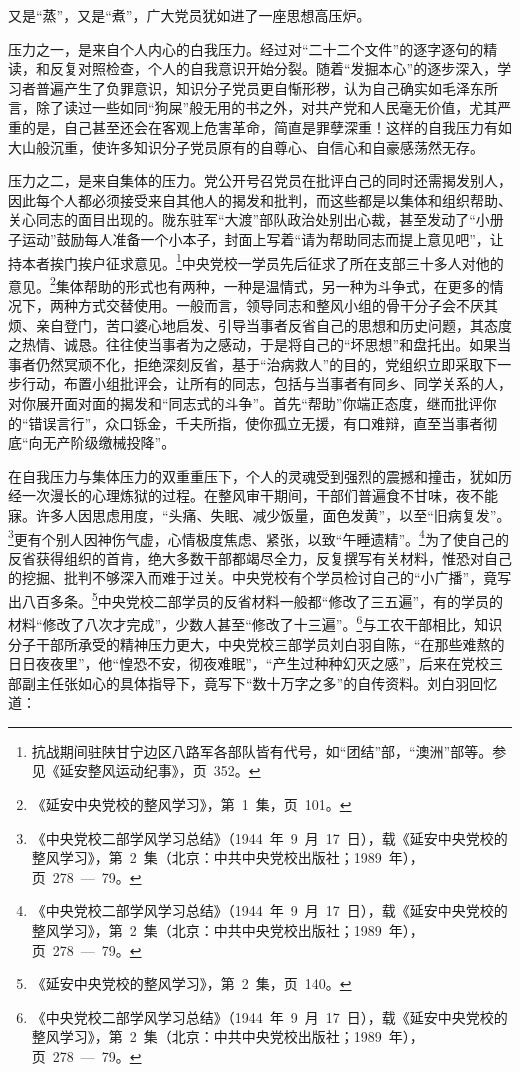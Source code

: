 又是“蒸”，又是“煮”，广大党员犹如进了一座思想高压炉。

压力之一，是来自个人内心的白我压力。经过对“二十二个文件”的逐字逐句的精读，和反复对照检查，个人的自我意识开始分裂。随着“发掘本心”的逐步深入，学习者普遍产生了负罪意识，知识分子党员更自惭形秽，认为自己确实如毛泽东所言，除了读过一些如同“狗屎”般无用的书之外，对共产党和人民毫无价值，尤其严重的是，自己甚至还会在客观上危害革命，简直是罪孽深重！这样的自我压力有如大山般沉重，使许多知识分子党员原有的自尊心、自信心和自豪感荡然无存。

压力之二，是来自集体的压力。党公开号召党员在批评白己的同时还需揭发别人，因此每个人都必须接受来自其他人的揭发和批判，而这些都是以集体和组织帮助、关心同志的面目出现的。陇东驻军“大渡”部队政治处别出心裁，甚至发动了“小册子运动”鼓励每人准备一个小本子，封面上写着“请为帮助同志而提上意见吧”，让持本者挨门挨户征求意见。\footnote{抗战期间驻陕甘宁边区八路军各部队皆有代号，如“团结”部，“澳洲”部等。参见《延安整风运动纪事》，页~352。}中央党校一学员先后征求了所在支部三十多人对他的意见。\footnote{《延安中央党校的整风学习》，第~1~集，页~101。}集体帮助的形式也有两种，一种是温情式，另一种为斗争式，在更多的情况下，两种方式交替使用。一般而言，领导同志和整风小组的骨干分子会不厌其烦、亲自登门，苦口婆心地启发、引导当事者反省自己的思想和历史问题，其态度之热情、诚恳。往往使当事者为之感动，于是将自己的“坏思想”和盘托出。如果当事者仍然冥顽不化，拒绝深刻反省，基于“治病救人”的目的，党组织立即采取下一步行动，布置小组批评会，让所有的同志，包括与当事者有同乡、同学关系的人，对你展开面对面的揭发和“同志式的斗争”。首先“帮助”你端正态度，继而批评你的“错误言行”，众口铄金，千夫所指，使你孤立无援，有口难辩，直至当事者彻底“向无产阶级缴械投降”。

在自我压力与集体压力的双重重压下，个人的灵魂受到强烈的震撼和撞击，犹如历经一次漫长的心理炼狱的过程。在整风审干期间，干部们普遍食不甘味，夜不能寐。许多人因思虑用度，“头痛、失眠、减少饭量，面色发黄”，以至“旧病复发”。\footnote{《中央党校二部学风学习总结》（1944~年~9~月~17~日），载《延安中央党校的整风学习》，第~2~集（北京：中共中央党校出版社；1989~年），页~278~—~79。}更有个别人因神伤气虚，心情极度焦虑、紧张，以致“午睡遗精”。\footnote{《中央党校二部学风学习总结》（1944~年~9~月~17~日），载《延安中央党校的整风学习》，第~2~集（北京：中共中央党校出版社；1989~年），页~278~—~79。}为了使自己的反省获得组织的首肯，绝大多数干部都竭尽全力，反复撰写有关材料，惟恐对自己的挖掘、批判不够深入而难于过关。中央党校有个学员检讨自己的“小广播”，竟写出八百多条。\footnote{《延安中央党校的整风学习》，第~2~集，页~140。}中央党校二部学员的反省材料一般都“修改了三五遍”，有的学员的材料“修改了八次才完成”，少数人甚至“修改了十三遍”。\footnote{《中央党校二部学风学习总结》（1944~年~9~月~17~日），载《延安中央党校的整风学习》，第~2~集（北京：中共中央党校出版社；1989~年），页~278~—~79。}与工农干部相比，知识分子干部所承受的精神压力更大，中央党校三部学员刘白羽自陈，“在那些难熬的日日夜夜里”，他“惶恐不安，彻夜难眠”，“产生过种种幻灭之感”，后来在党校三部副主任张如心的具体指导下，竟写下“数十万字之多”的自传资料。刘白羽回忆道：

